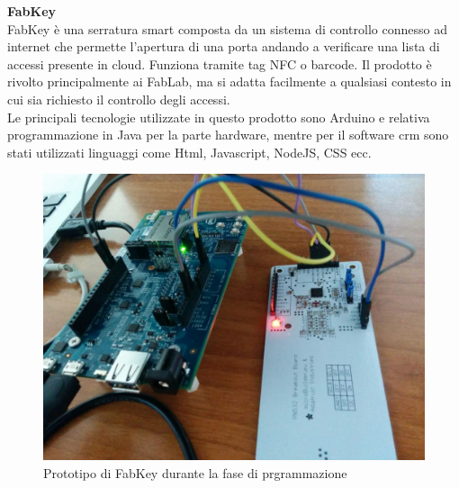 \noindent \textbf{FabKey}
\\
FabKey è una serratura smart composta da un sistema di controllo connesso ad internet che permette l'apertura di una porta andando a verificare una lista di accessi presente in cloud. Funziona tramite tag \gls{NFC} o barcode. Il prodotto è rivolto principalmente ai \gls{FabLab}, ma si adatta facilmente a qualsiasi contesto in cui sia richiesto il controllo degli accessi.\\
Le principali tecnologie utilizzate in questo prodotto sono Arduino e relativa programmazione in Java per la parte hardware, mentre per il software crm sono stati utilizzati linguaggi come Html, Javascript, NodeJS, CSS ecc.
\\
\begin{figure}[H]
	\begin{center}
	\includegraphics[scale=0.2]{immagini/fabkey.jpg}
	\caption{Prototipo di FabKey durante la fase di prgrammazione}
	\end{center}
\end{figure}

